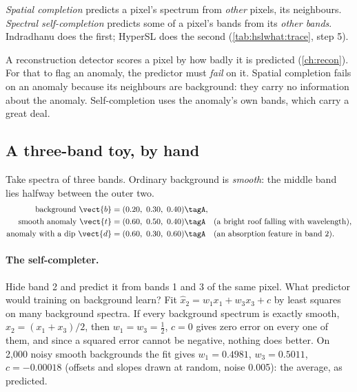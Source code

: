 \begin{definition}
\emph{Spatial completion} predicts a pixel's spectrum from \emph{other} pixels, its
neighbours. \emph{Spectral self-completion} predicts some of a pixel's bands from its
\emph{other bands}. Indradhanu does the first; HyperSL does the second (\cref{tab:hslwhat:trace}, step 5).
\end{definition}

A reconstruction detector scores a pixel by how badly it is predicted (\cref{ch:recon}). For that to flag an anomaly, the
predictor must \emph{fail} on it. Spatial completion fails on an anomaly because its neighbours are background: they
carry no information about the anomaly. Self-completion uses the anomaly's own bands, which carry a great deal.

\subsection{A three-band toy, by hand}

Take spectra of three bands. Ordinary background is \emph{smooth}: the middle band lies halfway between the outer two.
\begin{align*}
\text{background } \vect{b} &= (0.20,\ 0.30,\ 0.40) \tagA,\\
\text{smooth anomaly } \vect{t} &= (0.60,\ 0.50,\ 0.40) \tagA \quad\text{(a bright roof falling with wavelength)},\\
\text{anomaly with a dip } \vect{d} &= (0.60,\ 0.30,\ 0.60) \tagA \quad\text{(an absorption feature in band 2)}.
\end{align*}

\paragraph{The self-completer.} Hide band 2 and predict it from bands 1 and 3 of the same pixel. What predictor would
training on background learn? Fit $\hat x_2=w_1x_1+w_3x_3+c$ by least squares on many background spectra. If every
background spectrum is exactly smooth, $x_2=(x_1+x_3)/2$, then $w_1=w_3=\tfrac12$, $c=0$ gives zero error on every one of
them, and since a squared error cannot be negative, nothing does better. On 2,000 noisy smooth backgrounds the fit gives
$w_1=0.4981$, $w_3=0.5011$, $c=-0.00018$\tagC{} (offsets and slopes drawn at random, noise 0.005\tagA): the average, as
predicted.

